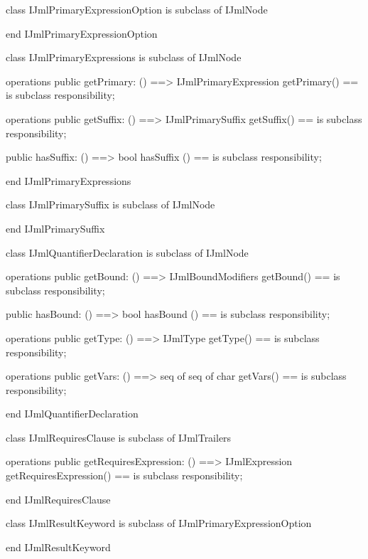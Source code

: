 \begin{vdm_al}
class IJmlPrimaryExpressionOption
 is subclass of IJmlNode

end IJmlPrimaryExpressionOption
\end{vdm_al}

\begin{vdm_al}
class IJmlPrimaryExpressions
 is subclass of IJmlNode

operations
  public getPrimary: () ==> IJmlPrimaryExpression
  getPrimary() == is subclass responsibility;

operations
  public getSuffix: () ==> IJmlPrimarySuffix
  getSuffix() == is subclass responsibility;

  public hasSuffix: () ==> bool
  hasSuffix () == is subclass responsibility;

end IJmlPrimaryExpressions
\end{vdm_al}

\begin{vdm_al}
class IJmlPrimarySuffix
 is subclass of IJmlNode

end IJmlPrimarySuffix
\end{vdm_al}

\begin{vdm_al}
class IJmlQuantifierDeclaration
 is subclass of IJmlNode

operations
  public getBound: () ==> IJmlBoundModifiers
  getBound() == is subclass responsibility;

  public hasBound: () ==> bool
  hasBound () == is subclass responsibility;

operations
  public getType: () ==> IJmlType
  getType() == is subclass responsibility;

operations
  public getVars: () ==> seq of seq of char
  getVars() == is subclass responsibility;

end IJmlQuantifierDeclaration
\end{vdm_al}

\begin{vdm_al}
class IJmlRequiresClause
 is subclass of IJmlTrailers

operations
  public getRequiresExpression: () ==> IJmlExpression
  getRequiresExpression() == is subclass responsibility;

end IJmlRequiresClause
\end{vdm_al}

\begin{vdm_al}
class IJmlResultKeyword
 is subclass of IJmlPrimaryExpressionOption

end IJmlResultKeyword
\end{vdm_al}

